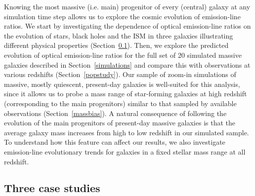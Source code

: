 \documentclass[fleqn,usenatbib]{mnras}
\begin{document}
Knowing the most massive (i.e. main) progenitor of every (central)
galaxy at any simulation time step allows us to explore the cosmic
evolution of emission-line ratios. We start by investigating the
dependence of optical emission-line ratios on the evolution of stars,
black holes and the ISM in three  galaxies illustrating different
physical properties (Section~\ref{casestudies}).  Then, we explore the
predicted evolution of optical emission-line ratios for  the full set
of 20 simulated massive galaxies described in
Section~\ref{simulations}  and compare this with observations at
various redshifts (Section~\ref{popstudy}). Our sample of zoom-in
simulations of massive, mostly quiescent, present-day  galaxies is
well-suited for this analysis, since it allows us to probe a mass
range of star-forming galaxies at high redshift (corresponding to the
main progenitors) similar to that sampled by available observations
(Section~\ref{massbias}). A natural consequence of following the
evolution of the main progenitors of present-day  massive galaxies is
that the average galaxy mass increases from high to low redshift in
our  simulated sample. To understand how this feature can affect our
results, we also investigate  emission-line evolutionary trends for
galaxies in a fixed stellar mass range at all redshift. 

\subsection{Three case studies}\label{casestudies} 
\end{document}
